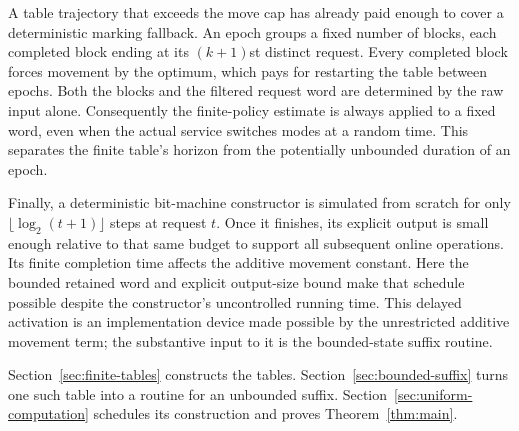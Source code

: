 A table trajectory that exceeds the move cap has already paid enough to
cover a deterministic marking fallback. An epoch groups a fixed number of
blocks, each completed block ending at its \((k+1)\)st distinct request.
Every completed block forces movement by the optimum, which pays for
restarting the table between epochs. Both the blocks and the filtered
request word are determined by the raw input alone. Consequently the
finite-policy estimate is always applied to a fixed word, even when the
actual service switches modes at a random time. This separates the finite
table's horizon from the potentially unbounded duration of an epoch.

Finally, a deterministic bit-machine constructor is simulated from scratch for only
\(\lfloor\log_2(t+1)\rfloor\) steps at request \(t\). Once it finishes, its
explicit output is small enough relative to that same budget to support all
subsequent online operations. Its finite completion time affects the additive
movement constant. Here the bounded retained word and explicit output-size
bound make that schedule possible despite the constructor's uncontrolled
running time.
This delayed activation is an implementation device made possible by the
unrestricted additive movement term; the substantive input to it is the
bounded-state suffix routine.

Section~\ref{sec:finite-tables} constructs the tables.
Section~\ref{sec:bounded-suffix} turns one such table into a routine for an
unbounded suffix. Section~\ref{sec:uniform-computation} schedules its
construction and proves Theorem~\ref{thm:main}.
